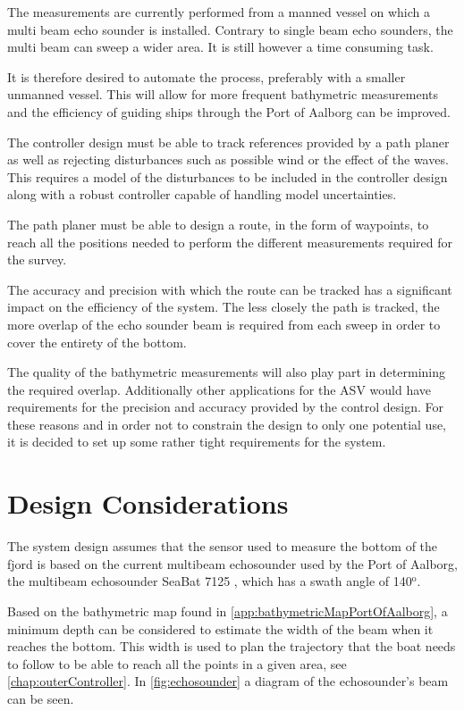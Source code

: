 The measurements are currently performed from a manned vessel on which a multi beam echo sounder is installed. Contrary to single beam echo sounders, the multi beam can sweep a wider area. It is still however a time consuming task.

It is therefore desired to automate the process, preferably with a smaller unmanned vessel. This will allow for more frequent bathymetric measurements and the efficiency of guiding ships through the Port of Aalborg can be improved.

The controller design must be able to track references provided by a path planer as well as rejecting disturbances such as possible wind or the effect of the waves. This requires a model of the disturbances to be included in the controller design along with a robust controller capable of handling model uncertainties.

The path planer must be able to design a route, in the form of waypoints, to reach all the positions needed to perform the different measurements required for the survey.

The accuracy and precision with which the route can be tracked has a significant impact on the efficiency of the system. The less closely the path is tracked, the more overlap of the echo sounder beam is required from each sweep in order to cover the entirety of the bottom.

The quality of the bathymetric measurements will also play part in determining the required overlap. Additionally other applications for the ASV would have requirements for the precision and accuracy provided by the control design. For these reasons and in order not to constrain the design to only one potential use, it is decided to set up some rather tight requirements for the system.

\section{Design Considerations}
The system design assumes that the sensor used to measure the bottom of the fjord is based on the current multibeam echosounder used by the Port of Aalborg, the multibeam echosounder SeaBat 7125 \cite{echoSounder}, which has a swath angle of 140$^\mathrm{o}$.

Based on the bathymetric map found in \autoref{app:bathymetricMapPortOfAalborg}, a minimum depth can be considered to estimate the width of the beam when it reaches the bottom. This width is used to plan the trajectory that the boat needs to follow to be able to reach all the points in a given area, see \autoref{chap:outerController}. In \autoref{fig:echosounder} a diagram of the echosounder's beam can be seen.


